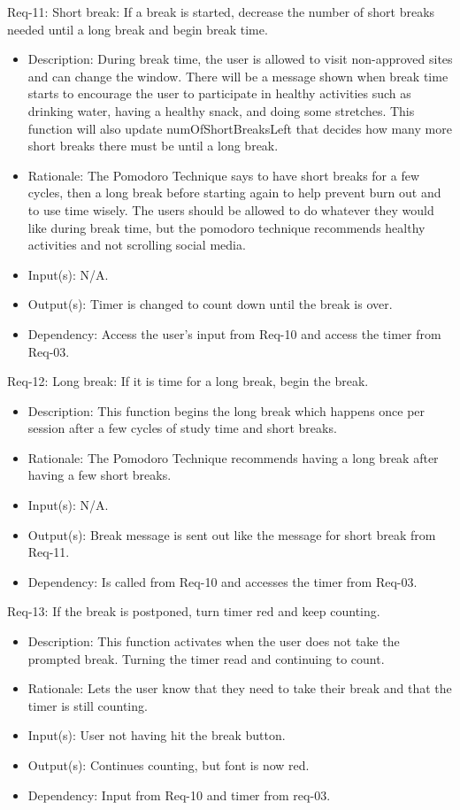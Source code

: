 \documentclass[12pt]{article}
\begin{document}
Req-11: Short break: If a break is started, decrease the number of short breaks needed until a long break and begin break time.  
\begin{itemize}
    \item Description: During break time, the user is allowed to visit non-approved sites and can change the window. There will be a message shown when break time starts to encourage the user to participate in healthy activities such as drinking water, having a healthy snack, and doing some stretches.  This function will also update numOfShortBreaksLeft that decides how many more short breaks there must be until a long break.  
    \item Rationale: The Pomodoro Technique says to have short breaks for a few cycles, then a long break before starting again to help prevent burn out and to use time wisely. The users should be allowed to do whatever they would like during break time, but the pomodoro technique recommends healthy activities and not scrolling social media.  
    \item Input(s): N/A.
    \item Output(s): Timer is changed to count down until the break is over.  
    \item Dependency: Access the user’s input from Req-10 and access the timer from Req-03.  
\end{itemize}
Req-12: Long break: If it is time for a long break, begin the break. 
\begin{itemize}
    \item Description: This function begins the long break which happens once per session after a few cycles of study time and short breaks.  
    \item Rationale: The Pomodoro Technique recommends having a long break after having a few short breaks.  
    \item Input(s): N/A.
    \item Output(s): Break message is sent out like the message for short break from Req-11. 
    \item Dependency: Is called from Req-10 and accesses the timer from Req-03.
\end{itemize}
Req-13: If the break is postponed, turn timer red and keep counting. 
\begin{itemize}
    \item Description: This function activates when the user does not take the prompted break. Turning the timer read and continuing to count.
    \item Rationale: Lets the user know that they need to take their break and that the timer is still counting. 
    \item Input(s): User not having hit the break button. 
    \item Output(s): Continues counting, but font is now red. 
    \item Dependency: Input from Req-10 and timer from req-03.
\end{itemize}
\end{document}
